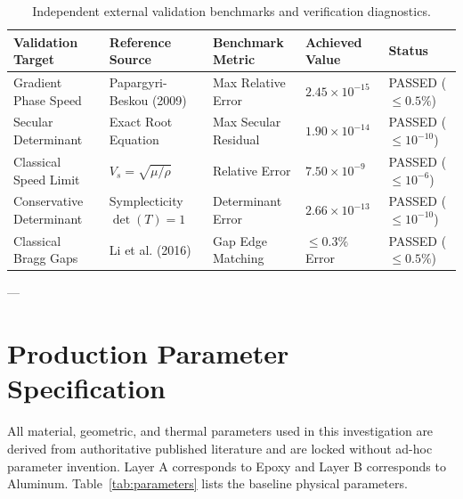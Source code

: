 \documentclass[11pt,a4paper]{article}
\begin{document}
\begin{table}[htbp]
\centering
\caption{Independent external validation benchmarks and verification diagnostics.}
\label{tab:validation_summary}
\small
\begin{tabular*}{\textwidth}{@{\extracolsep{\fill}}lllll@{}}
\toprule
Validation Target & Reference Source & Benchmark Metric & Achieved Value & Status \\
\midrule
Gradient Phase Speed & Papargyri-Beskou (2009) \cite{papargyribeskou2009wave} & Max Relative Error & $2.45 \times 10^{-15}$ & PASSED ($\le 0.5\%$) \\
Secular Determinant & Exact Root Equation & Max Secular Residual & $1.90 \times 10^{-14}$ & PASSED ($\le 10^{-10}$) \\
Classical Speed Limit & $V_s = \sqrt{\mu/\rho}$ & Relative Error & $7.50 \times 10^{-9}$ & PASSED ($\le 10^{-6}$) \\
Conservative Determinant & Symplecticity $\det(T)=1$ & Determinant Error & $2.66 \times 10^{-13}$ & PASSED ($\le 10^{-10}$) \\
Classical Bragg Gaps & Li et al. (2016) \cite{li2016band} & Gap Edge Matching & $\le 0.3\%$ Error & PASSED ($\le 0.5\%$) \\
\bottomrule
\end{tabular*}
\end{table}

---

\section{Production Parameter Specification}
\label{sec:parameters}

All material, geometric, and thermal parameters used in this investigation are derived from authoritative published literature \cite{li2016band,li2023thermoelastic,papargyribeskou2009wave} and are locked without ad-hoc parameter invention. Layer A corresponds to Epoxy and Layer B corresponds to Aluminum. Table~\ref{tab:parameters} lists the baseline physical parameters.
\end{document}
